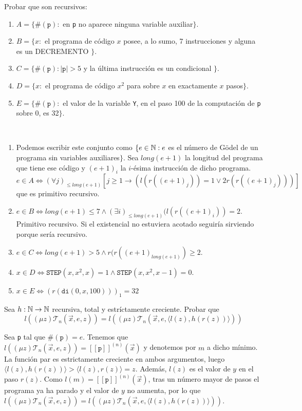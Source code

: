 \documentclass[twoside]{article}
\begin{document}
\newpage
\begin{ejercicio}{6}
Probar que son recursivos:
\begin{enumerate}
\item $A = \{\#(\texttt{p}) :$ en \texttt{p} no aparece ninguna variable auxiliar$\}$.
\item $B = \{x :$ el programa de código $x$ posee, a lo sumo, 7 instrucciones y alguna es un DECREMENTO $\}$.
\item $C = \{\#(\texttt{p}) : |\texttt{p}| > 5$ y la última instrucción es un condicional $\}$.
\item $D = \{x :$ el programa de código $x^2$ para sobre $x$ en exactamente $x$ pasos$\}$.
\item $E = \{\#(\texttt{p}) :$ el valor de la variable \texttt{Y}, en el paso 100 de la computación de \texttt{p} sobre 0, es 32$\}$.
\end{enumerate}
\end{ejercicio}
\begin{solucion}\
\begin{enumerate}
\item Podemos escribir este conjunto como $\{e\in\mathbb{N}: e$ es el número de Gödel de un programa sin variables auxiliares$\}$. Sea $long(e+1)$ la longitud del programa que tiene ese código y $(e+1)_i$ la $i$-ésima instrucción de dicho programa. $e\in A\Leftrightarrow(\forall j)_{\leq long(e+1)}[j\geq 1\rightarrow (l(r((e+1)_j))=1\lor 2r(r((e+1)_j)))]$ que es primitivo recursivo.
\item $e\in B\Leftrightarrow long(e+1)\leq 7 \land (\exists i)_{\leq long(e+1)}(l(r((e+1)_i))=2$. Primitivo recursivo. Si el existencial no estuviera acotado seguiría sirviendo porque sería recursivo.
\item $e\in C\Leftrightarrow long(e+1)>5\land r(r((e+1)_{long(e+1)})\geq 2$.
\item $x\in D\Leftrightarrow \texttt{STEP}(x,x^2,x)=1\land \texttt{STEP}(x,x^2,x-1)=0$. 
\item $x\in E\Leftrightarrow (r(\texttt{di}(0,x,100)))_1=32$
\end{enumerate}
\end{solucion}
\newpage

\begin{ejercicio}{7}
Sea $h : \mathbb{N} \to \mathbb{N}$ recursiva, total y estríctamente creciente. Probar que
\[ l((μ z) \mathcal{T}_n(\vec{x},e,z)) = l((μ z) \mathcal{T}_n (\vec{x},e, \langle l(z),h(r(z))\rangle ))\]
\end{ejercicio}
\begin{solucion}
Sea \texttt{p} tal que $\#(\texttt{p})=e$. Tenemos que $l((μ z) \mathcal{T}_n(\vec{x},e,z))=[\![\texttt{p}]\!]^{(n)}(\vec{x})$ y denotemos por $m$ a dicho mínimo. 
La función par es estrictamente creciente en ambos argumentos, luego  $\langle l(z),h(r(z))\rangle> \langle l(z),r(z)\rangle=z$. Además, $l(z)$ es el valor de $y$ en el paso $r(z)$. Como $l(m)=[\![\texttt{p}]\!]^{(n)}(\vec{x})$, tras un número mayor de pasos el programa ya ha parado y el valor de $y$ no aumenta, por lo que $l((μ z) \mathcal{T}_n(\vec{x},e,z)) = l((μ z) \mathcal{T}_n (\vec{x},e, \langle l(z),h(r(z))\rangle ))$.
\end{solucion}
\end{document}

